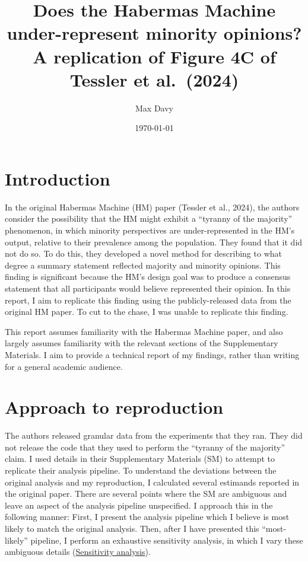 \documentclass[11pt,a4paper]{article}
\title{Does the Habermas Machine under-represent minority opinions?\\
       \large A replication of Figure 4C of Tessler et al.\ (2024)}
\author{Max Davy}
\date{\today}
\begin{document}
\maketitle

\section*{Introduction}

In the original Habermas Machine (HM) paper (Tessler et al., 2024), the authors consider the
possibility that the HM
might exhibit a ``tyranny of the majority'' phenomenon, in which minority perspectives are
under-represented in the HM's output, relative to their prevalence among the population. They
found that it did not do so. To do this, they developed a novel method for describing to what
degree a summary statement reflected majority and minority opinions. This finding is significant
because the HM's design goal was to produce a consensus statement that all participants would
believe represented their opinion. In this report, I aim to replicate this finding using the
publicly-released data from the original HM paper. To cut to the chase, I was unable to replicate
this finding.

This report assumes familiarity with the Habermas Machine paper, and also largely assumes familiarity
with the relevant sections of the Supplementary Materials. I aim to provide a technical report of my findings,
rather than writing for a general academic audience.

\section*{Approach to reproduction}

The authors released granular data from the experiments that they ran. They did not release the
code that they used to perform the ``tyranny of the majority'' claim. I used details in their
Supplementary Materials (SM) to attempt to replicate their analysis pipeline. To understand the
deviations between the original analysis and my reproduction, I calculated several estimands
reported in the original paper. There are several points where the SM are ambiguous and leave an
aspect of the analysis pipeline unspecified. I approach this in the following manner: First, I
present the analysis pipeline which I believe is most likely to match the original analysis. Then,
after I have presented this ``most-likely'' pipeline, I perform an exhaustive sensitivity analysis,
in which I vary these ambiguous details (\hyperref[sec:sensitivity]{Sensitivity analysis}).
\end{document}
